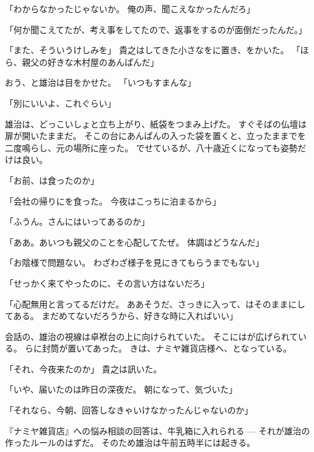 \documentclass[chapter3.tex]{subfiles}
\begin{document}
\begin{CJK}{UTF8}{ipxm}
    「わからなかったじゃないか。
    俺の声、聞こえなかったんだろ」

    「何か聞こえてたが、考え事をしてたので、返事をするのが面倒だったんだ。」

    「また、そういうけしみを」
    貴之はしてきた小さなをに置き、をかいた。
    「ほら、親父の好きな木村屋のあんぱんだ」

    おう、と雄治は目をかせた。
    「いつもすまんな」

    「別にいいよ、これぐらい」

    雄治は、どっこいしょと立ち上がり、紙袋をつまみ上げた。
    すぐそばの仏壇は扉が開いたままだ。
    そこの台にあんぱんの入った袋を置くと、立ったままでを二度鳴らし、元の場所に座った。
    でせているが、八十歳近くになっても姿勢だけは良い。

    「お前、は食ったのか」

    「会社の帰りにを食った。
    今夜はこっちに泊まるから」

    「ふうん。さんにはいってあるのか」

    「ああ。あいつも親父のことを心配してたぜ。
    体調はどうなんだ」

    「お陰様で問題ない。
    わざわざ様子を見にきてもらうまでもない」

    「せっかく来てやったのに、その言い方はないだろ」

    「心配無用と言ってるだけだ。
    ああそうだ、さっきに入って、はそのままにしてある。
    まだめてないだろうから、好きな時に入ればいい」

    会話の、雄治の視線は卓袱台の上に向けられていた。
    そこにはが広げられている。
    らに封筒が置いてあった。
    きは、ナミヤ雑貨店様へ、となっている。

    「それ、今夜来たのか」
    貴之は訊いた。

    「いや、届いたのは昨日の深夜だ。
    朝になって、気づいた」

    「それなら、今朝、回答しなきゃいけなかったんじゃないのか」

    『ナミヤ雑貨店』への悩み相談の回答は、牛乳箱に入れられる --- それが雄治の作ったルールのはずだ。
    そのため雄治は午前五時半には起きる。


\end{CJK}
\end{document}
